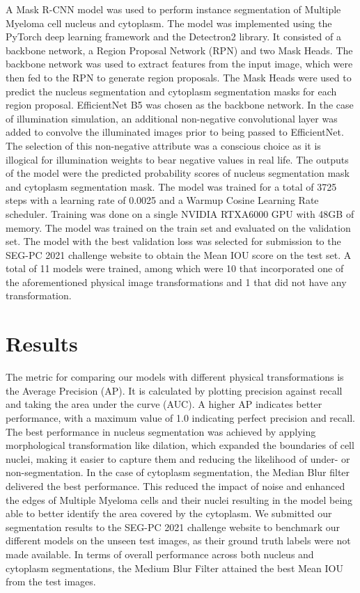 \documentclass{article}
\begin{document}
A Mask R-CNN model was used to perform instance segmentation of Multiple Myeloma cell nucleus and cytoplasm. The model was implemented using the PyTorch deep learning framework and the Detectron2 library. It consisted of a backbone network, a Region Proposal Network (RPN) and two Mask Heads. The backbone network was used to extract features from the input image, which were then fed to the RPN to generate region proposals. The Mask Heads were used to predict the nucleus segmentation and cytoplasm segmentation masks for each region proposal. EfficientNet B5 was chosen as the backbone network. In the case of illumination simulation, an additional non-negative convolutional layer was added to convolve the illuminated images prior to being passed to EfficientNet. The selection of this non-negative attribute was a conscious choice as it is illogical for illumination weights to bear negative values in real life. The outputs of the model were the predicted probability scores of nucleus segmentation mask and cytoplasm segmentation mask. The model was trained for a total of 3725 steps with a learning rate of 0.0025 and a Warmup Cosine Learning Rate scheduler. Training was done on a single NVIDIA RTXA6000 GPU with 48GB of memory. The model was trained on the train set and evaluated on the validation set. The model with the best validation loss was selected for submission to the SEG-PC 2021 challenge website to obtain the Mean IOU score on the test set. A total of 11 models were trained, among which were 10 that incorporated one of the aforementioned physical image transformations and 1 that did not have any transformation.

\section{Results}

The metric for comparing our models with different physical transformations is the Average Precision (AP). It is calculated by plotting precision against recall and taking the area under the curve (AUC). A higher AP indicates better performance, with a maximum value of 1.0 indicating perfect precision and recall. The best performance in nucleus segmentation was achieved by applying morphological transformation like dilation, which expanded the boundaries of cell nuclei, making it easier to capture them and reducing the likelihood of under- or non-segmentation. In the case of cytoplasm segmentation, the Median Blur filter delivered the best performance. This reduced the impact of noise and enhanced the edges of Multiple Myeloma cells and their nuclei resulting in the model being able to better identify the area covered by the cytoplasm. We submitted our segmentation results to the SEG-PC 2021 challenge website to benchmark our different models on the unseen test images, as their ground truth labels were not made available. In terms of overall performance across both nucleus and cytoplasm segmentations, the Medium Blur Filter attained the best Mean IOU from the test images.
\end{document}
